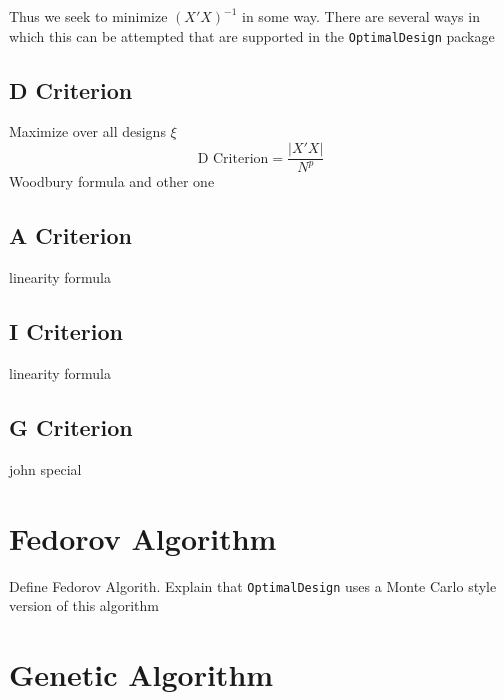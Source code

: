 \documentclass{article}\usepackage[]{graphicx}\usepackage[]{color}
\begin{document}
Thus we seek to minimize $(X'X)^{-1}$ in some way. There are several ways in which this can be attempted that are supported in the \texttt{OptimalDesign} package

\subsection{D Criterion}
Maximize over all designs $\xi$
$$ \mbox{D Criterion} = \frac{|X'X|}{N^p} $$
Woodbury formula and other one

\subsection{A Criterion}

linearity formula

\subsection{I Criterion}

linearity formula

\subsection{G Criterion}

john special

\section{Fedorov Algorithm}

Define Fedorov Algorith. Explain that \texttt{OptimalDesign} uses a Monte Carlo style version of this algorithm

\section{Genetic Algorithm}
\end{document}
